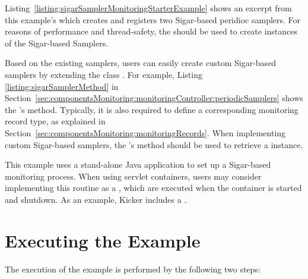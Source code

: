 Listing~\ref{listing:sigarSamplerMonitoringStarterExample} shows an excerpt from %
this example's  %
which creates and registers two Sigar-based peridioc samplers. %
For reasons of performance and thread-safety, the  %
should be used to create instances of the Sigar-based Samplers. 


\setJavaCodeListing


\noindent Based on the existing samplers, users can easily create custom Sigar-based %
samplers by extending the class . For example, Listing~%
\ref{listing:sigarSamplerMethod} in Section~\ref{sec:componentsMonitoring:monitoringController:periodicSamplers} %
shows the 's  method. %
Typically, it is also required to define a corresponding monitoring record type, %
as explained in Section~\ref{sec:componentsMonitoring:monitoringRecords}. %
When implementing custom Sigar-based samplers, the 's  method should %
be used to retrieve a  instance. %

This example uses a stand-alone Java application to set up %
a Sigar-based monitoring process. When using servlet containers,  %
users may consider implementing this routine as a , %
which are executed when the container is started and shutdown. %
As an example, Kicker includes a . %

\section{Executing the Example}

The execution of the example is performed by the following two steps:\\

